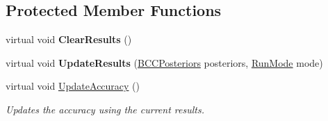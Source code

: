 \subsection*{Protected Member Functions}
\begin{DoxyCompactItemize}
\item 
\hypertarget{class_crowdsourcing_models_1_1_results_a2571bb4f6789430a83286b96e0d8059d}{}virtual void {\bfseries Clear\+Results} ()\label{class_crowdsourcing_models_1_1_results_a2571bb4f6789430a83286b96e0d8059d}

\item 
\hypertarget{class_crowdsourcing_models_1_1_results_a34576e53d2a70c54862fa350f0cb87d7}{}virtual void {\bfseries Update\+Results} (\hyperlink{class_crowdsourcing_models_1_1_b_c_c_posteriors}{B\+C\+C\+Posteriors} posteriors, \hyperlink{namespace_crowdsourcing_models_ac2299b85781ea82aa2c8850723c8a063}{Run\+Mode} mode)\label{class_crowdsourcing_models_1_1_results_a34576e53d2a70c54862fa350f0cb87d7}

\item 
virtual void \hyperlink{class_crowdsourcing_models_1_1_results_aabeef9fdac232ed2f8a904f3c15d2e0e}{Update\+Accuracy} ()
\begin{DoxyCompactList}\small\item\em Updates the accuracy using the current results. \end{DoxyCompactList}\end{DoxyCompactItemize}
